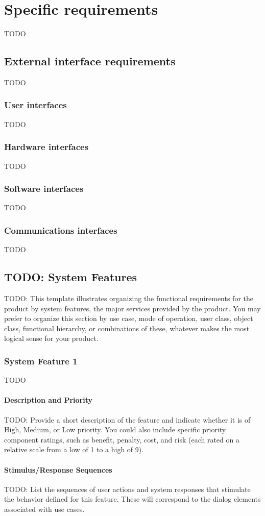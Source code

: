 \section{Specific requirements}
TODO
\subsection{External interface requirements}
TODO
\subsubsection{User interfaces}
TODO
\subsubsection{Hardware interfaces}
TODO
\subsubsection{Software interfaces}
TODO
\subsubsection{Communications interfaces}
TODO
\subsection{TODO: System Features}
TODO: This template illustrates organizing the functional requirements for the product by system features, the major services provided by the product. You may prefer to organize this section by use case, mode of operation, user class, object class, functional hierarchy, or combinations of these, whatever makes the most logical sense for your product.
\subsubsection{System Feature 1}
TODO
\paragraph{Description and Priority}
TODO: Provide a short description of the feature and indicate whether it is of High, Medium, or Low priority. You could also include specific priority component ratings, such as benefit, penalty, cost, and risk (each rated on a relative scale from a low of 1 to a high of 9).
\paragraph{Stimulus/Response Sequences}
TODO: List the sequences of user actions and system responses that stimulate the behavior defined for this feature. These will correspond to the dialog elements associated with use cases.
